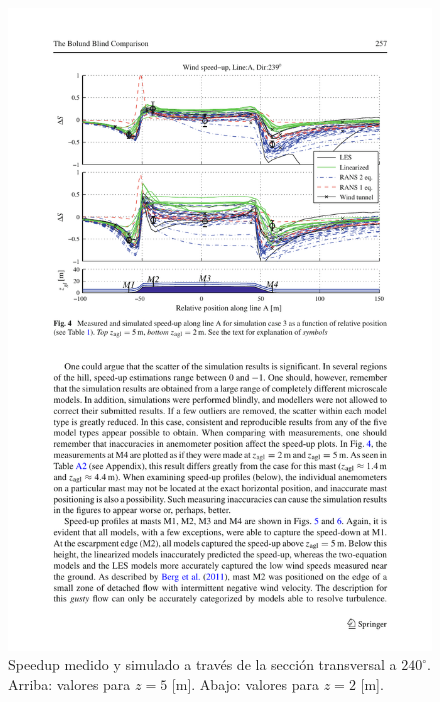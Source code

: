 \begin{figure}[H]
	\centering
	\includegraphics[width=0.9\linewidth,trim={1.7cm 12.3cm 0.9cm 2cm},clip]{bolund2.pdf}%
	\caption{Speedup medido y simulado a través de la sección transversal a $240^\circ$. Arriba: valores para $z=5$ [m]. Abajo: valores para $z=2$ [m].}
	\label{fig:an1_speedup}
\end{figure}

